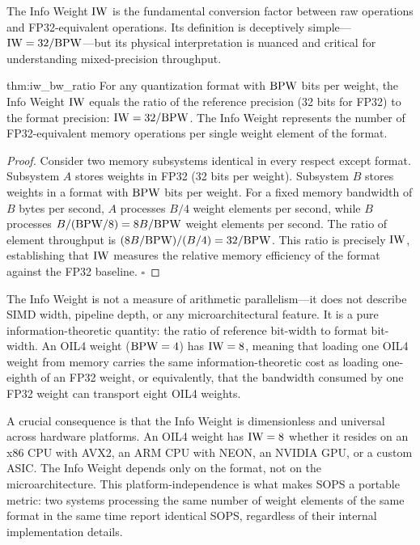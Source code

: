 The Info Weight $\mathrm{IW}$ is the fundamental conversion factor between raw operations and FP32-equivalent operations. Its definition is deceptively simple---$\mathrm{IW} = 32 / \textnormal{BPW}$---but its physical interpretation is nuanced and critical for understanding mixed-precision throughput.

\begin{mythm}[Info Weight = Memory Bandwidth Ratio]{thm:iw_bw_ratio}
For any quantization format with $\textnormal{BPW}$ bits per weight, the Info Weight $\mathrm{IW}$ equals the ratio of the reference precision (32 bits for FP32) to the format precision: $\mathrm{IW} = 32 / \textnormal{BPW}$. The Info Weight represents the number of FP32-equivalent memory operations per single weight element of the format.
\end{mythm}

\begin{proof}
Consider two memory subsystems identical in every respect except format. Subsystem $A$ stores weights in FP32 (32 bits per weight). Subsystem $B$ stores weights in a format with $\textnormal{BPW}$ bits per weight. For a fixed memory bandwidth of $B$ bytes per second, $A$ processes $B/4$ weight elements per second, while $B$ processes $B / (\textnormal{BPW}/8) = 8B / \textnormal{BPW}$ weight elements per second. The ratio of element throughput is $(8B / \textnormal{BPW}) / (B / 4) = 32 / \textnormal{BPW}$. This ratio is precisely $\mathrm{IW}$, establishing that $\mathrm{IW}$ measures the relative memory efficiency of the format against the FP32 baseline. $\square$
\end{proof}

The Info Weight is not a measure of arithmetic parallelism---it does not describe SIMD width, pipeline depth, or any microarchitectural feature. It is a pure information-theoretic quantity: the ratio of reference bit-width to format bit-width. An OIL4 weight ($\textnormal{BPW} = 4$) has $\mathrm{IW} = 8$, meaning that loading one OIL4 weight from memory carries the same information-theoretic cost as loading one-eighth of an FP32 weight, or equivalently, that the bandwidth consumed by one FP32 weight can transport eight OIL4 weights.

A crucial consequence is that the Info Weight is dimensionless and universal across hardware platforms. An OIL4 weight has $\mathrm{IW} = 8$ whether it resides on an x86 CPU with AVX2, an ARM CPU with NEON, an NVIDIA GPU, or a custom ASIC. The Info Weight depends only on the format, not on the microarchitecture. This platform-independence is what makes SOPS a portable metric: two systems processing the same number of weight elements of the same format in the same time report identical SOPS, regardless of their internal implementation details.

